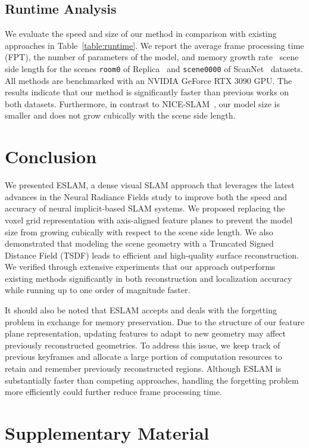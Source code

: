 \subsection{Runtime Analysis} \label{sec:c4_runtime}
We evaluate the speed and size of our method in comparison with existing approaches in Table~\ref{table:runtime}. We report the average frame processing time (FPT), the number of parameters of the model, and memory growth rate \wrt~scene side length for the scenes \texttt{room0} of Replica~\citep{replica19arxiv} and \texttt{scene0000} of ScanNet~\citep{dai2017scannet} datasets. All methods are benchmarked with an NVIDIA GeForce RTX 3090 GPU. The results indicate that our method is significantly faster than previous works on both datasets. Furthermore, in contrast to NICE-SLAM~\citep{zhu2022nice}, our model size is smaller and does not grow cubically with the scene side length.

\section{Conclusion}
We presented ESLAM, a dense visual SLAM approach that leverages the latest advances in the Neural Radiance Fields study to improve both the speed and accuracy of neural implicit-based SLAM systems. We proposed replacing the voxel grid representation with axis-aligned feature planes to prevent the model size from growing cubically with respect to the scene side length. We also demonstrated that modeling the scene geometry with a Truncated Signed Distance Field (TSDF) leads to efficient and high-quality surface reconstruction. We verified through extensive experiments that our approach outperforms existing methods significantly in both reconstruction and localization accuracy while running up to one order of magnitude faster.

It should also be noted that ESLAM accepts and deals with the forgetting problem in exchange for memory preservation. Due to the structure of our feature plane representation, updating features to adapt to new geometry may affect previously reconstructed geometries. To address this issue, we keep track of previous keyframes and allocate a large portion of computation resources to retain and remember previously reconstructed regions. Although ESLAM is substantially faster than competing approaches, handling the forgetting problem more efficiently could further reduce frame processing time.

\clearpage

\section{Supplementary Material} \label{sec:c4_supp}

